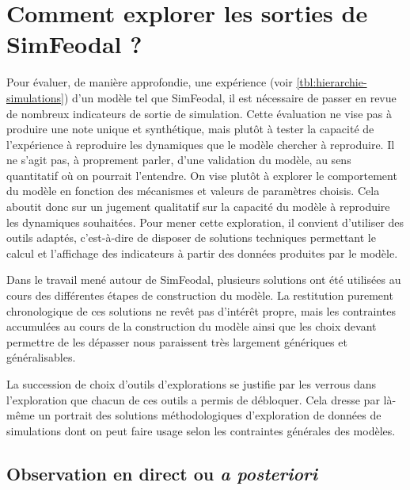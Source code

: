 \clearpage
\section[Comment explorer les sorties de SimFeodal ?]{Comment explorer les sorties de SimFeodal ?%
}\label{sec:explorer-sorties-simfeodal}

	Pour évaluer, de manière approfondie, une expérience (voir \cref{tbl:hierarchie-simulations}) d'un modèle tel que SimFeodal, il est nécessaire de passer en revue de nombreux indicateurs de sortie de simulation.
	Cette évaluation ne vise pas à produire une \og note\fg{} unique et synthétique, mais plutôt à tester la capacité de l'expérience à reproduire les dynamiques que le modèle chercher à reproduire.
	Il ne s'agit pas, à proprement parler, d'une validation du modèle, au sens quantitatif où on pourrait l'entendre.
	On vise plutôt à explorer le comportement du modèle en fonction des mécanismes et valeurs de paramètres choisis.
	Cela aboutit donc sur un jugement qualitatif sur la capacité du modèle à reproduire les dynamiques souhaitées.
	Pour mener cette exploration, il convient d'utiliser des outils adaptés, c'est-à-dire de disposer de solutions techniques permettant le calcul et l'affichage des indicateurs à partir des données produites par le modèle.
	
	Dans le travail mené autour de SimFeodal, plusieurs solutions ont été utilisées au cours des différentes étapes de construction du modèle.
	La restitution purement chronologique de ces solutions ne revêt pas d'intérêt propre, mais les contraintes accumulées au cours de la construction du modèle ainsi que les choix devant permettre de les dépasser nous paraissent très largement génériques et généralisables.
	
	La succession de choix d'outils d'explorations se justifie par les verrous dans l'exploration que chacun de ces outils a permis de débloquer.
	Cela dresse par là-même un portrait des solutions méthodologiques d'exploration de données de simulations dont on peut faire usage selon les contraintes générales des modèles.

	\subsection{Observation en direct ou \textit{a posteriori}}\label{subsec:observation-a-posteriori}

